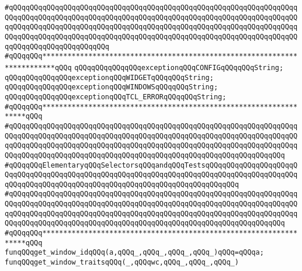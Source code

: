 \verb|#qQQqqQQqqQQqqQQqqQQqqQQqqQQqqQQqqQQqqQQqqQQqqQQqqQQqqQQqqQQqqQQqqQQqqQQqqQQqqQQqqQQqqQQqqQQqqQQqqQQqqQQqqQQqqQQqqQQqqQQqqQQqqQQqqQQqqQQqqQQqqQQqqQQqqQQqqQQqqQQqqQQqqQQqqQQqqQQqqQQqqQQqqQQqqQQqqQQqqQQqqQQqqQQqqQQqqQQqqQQqqQQqqQQqqQQqqQQqqQQqqQQqqQQqqQQqqQQqqQQqqQQqqQQqqQQqqQQqqQQqqQQqqQQqqQQqqQQqqQQqqQQq|\newline
\verb|#qQQqqQQq*************************************************************************qQQq|\newline
\newline
\verb|qQQqqQQqqQQqqQQqexceptionqQQqCONFIGqQQqqQQqString;|\newline
\verb|qQQqqQQqqQQqqQQqexceptionqQQqWIDGETqQQqqQQqString;|\newline
\verb|qQQqqQQqqQQqqQQqexceptionqQQqWINDOWSqQQqqQQqString;|\newline
\verb|qQQqqQQqqQQqqQQqexceptionqQQqTCL_ERRORqQQqqQQqString;|\newline
\newline
\newline
\newline
\verb|#qQQqqQQq******************************************************************qQQq|\newline
\verb|#qQQqqQQqqQQqqQQqqQQqqQQqqQQqqQQqqQQqqQQqqQQqqQQqqQQqqQQqqQQqqQQqqQQqqQQqqQQqqQQqqQQqqQQqqQQqqQQqqQQqqQQqqQQqqQQqqQQqqQQqqQQqqQQqqQQqqQQqqQQqqQQqqQQqqQQqqQQqqQQqqQQqqQQqqQQqqQQqqQQqqQQqqQQqqQQqqQQqqQQqqQQqqQQqqQQqqQQqqQQqqQQqqQQqqQQqqQQqqQQqqQQqqQQqqQQqqQQqqQQqqQQqqQQqqQQqqQQq|\newline
\verb|#qQQqqQQqElementaryqQQqSelectorsqQQqandqQQqTestsqQQqqQQqqQQqqQQqqQQqqQQqqQQqqQQqqQQqqQQqqQQqqQQqqQQqqQQqqQQqqQQqqQQqqQQqqQQqqQQqqQQqqQQqqQQqqQQqqQQqqQQqqQQqqQQqqQQqqQQqqQQqqQQqqQQqqQQqqQQqqQQqqQQq|\newline
\verb|#qQQqqQQqqQQqqQQqqQQqqQQqqQQqqQQqqQQqqQQqqQQqqQQqqQQqqQQqqQQqqQQqqQQqqQQqqQQqqQQqqQQqqQQqqQQqqQQqqQQqqQQqqQQqqQQqqQQqqQQqqQQqqQQqqQQqqQQqqQQqqQQqqQQqqQQqqQQqqQQqqQQqqQQqqQQqqQQqqQQqqQQqqQQqqQQqqQQqqQQqqQQqqQQqqQQqqQQqqQQqqQQqqQQqqQQqqQQqqQQqqQQqqQQqqQQqqQQqqQQqqQQqqQQqqQQqqQQq|\newline
\verb|#qQQqqQQq******************************************************************qQQq|\newline
\newline
\verb|funqQQqget_window_idqQQq(a,qQQq_,qQQq_,qQQq_,qQQq_)qQQq=qQQqa;|\newline
\newline
\verb|funqQQqget_window_traitsqQQq(_,qQQqwc,qQQq_,qQQq_,qQQq_)|\newline
